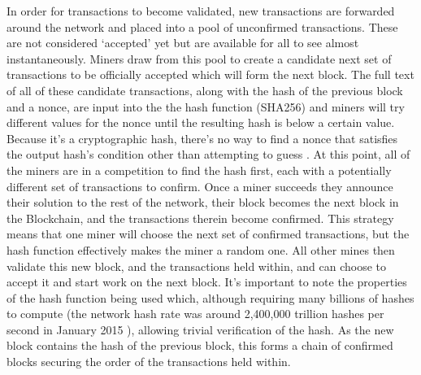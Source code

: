 \documentclass{article}
\begin{document}
In order for transactions to become validated, new transactions are forwarded around the network and placed into a pool of unconfirmed transactions. These are not considered `accepted' yet but are available for all to see almost instantaneously. Miners draw from this pool to create a candidate next set of transactions to be officially accepted which will form the next block. The full text of all of these candidate transactions, along with the hash of the previous block and a nonce, are input into the the hash function (SHA256) and miners will try different values for the nonce until the resulting hash is below a certain value. Because it’s a cryptographic hash, there’s no way to find a nonce that satisfies the output hash’s condition other than attempting to guess \citep{20_developer_guide_bitcoin_2016}. At this point, all of the miners are in a competition to find the hash first, each with a potentially different set of transactions to confirm. Once a miner succeeds they announce their solution to the rest of the network, their block becomes the next block in the Blockchain, and the transactions therein become confirmed. This strategy means that one miner will choose the next set of confirmed transactions, but the hash function effectively makes the miner a random one. All other mines then validate this new block, and the transactions held within, and can choose to accept it and start work on the next block. It's important to note the properties of the hash function being used which, although requiring many billions of hashes to compute (the network hash rate was around 2,400,000 trillion hashes per second in January 2015 \citep{34_hash_per_second_bitcoin_wiki_2016}), allowing trivial verification of the hash. As the new block contains the hash of the previous block, this forms a chain of confirmed blocks securing the order of the transactions held within.
\end{document}
